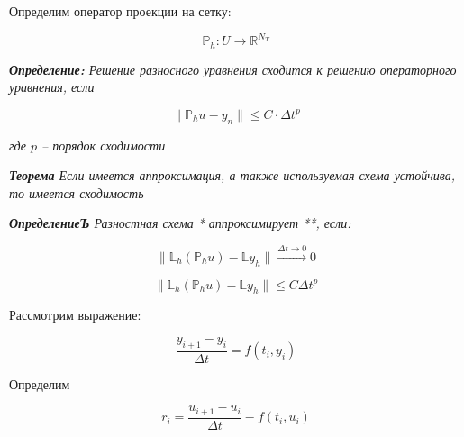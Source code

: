 \documentclass[10pt,a4paper]{article}
\begin{document}
 	Определим оператор проекции на сетку:
 	
 	\begin{equation}
 		\mathbb{P}_{h}: U \rightarrow \mathbb{R}^{N_{T}}
 	\end{equation}
 	
 	\textit{\textbf{Определение:} Решение разносного уравнения сходится к 
 	решению операторного уравнения, если }
 	
 	\begin{equation}
 		\parallel \mathbb{P}_{h} u - y_{n}\parallel \leqslant C\cdot\Delta t^{p}
 	\end{equation}
 	
 	\textit{где $p$ -- порядок сходимости}
 	
 	\textit{\textbf{Теорема} Если имеется аппроксимация, а также используемая 
 	схема устойчива, то имеется сходимость}%
 	
 	\textit{\textbf{ОпределениеЪ} Разностная схема * аппроксимирует **, если:}
 	
 	\begin{equation}
 		\parallel \mathbb{L}_{h}\left(\mathbb{P}_{h}u\right) - \mathbb{L}y_{h}
 		\parallel \xrightarrow{\Delta t \to 0} 0
 	\end{equation}
 	
 	\begin{equation}
 		\parallel \mathbb{L}_{h}\left(\mathbb{P}_{h}u\right) - \mathbb{L}y_{h}
 		\parallel \leqslant C\Delta t^{p}
 	\end{equation}
 	
 	Рассмотрим выражение:
 	
 	\begin{equation}
 		\frac{y_{i + 1} - y_{i}}{\Delta t} = f\left(t_{i}, y_{i}\right)
 	\end{equation}
 	
 	Определим 
 	
 	\begin{equation}
 		r_{i} = \frac{u_{i + 1} - u_{i}}{\Delta t} - f\left(t_{i}, u_{i}\right)
 	\end{equation}
	
	
	
\end{document}

